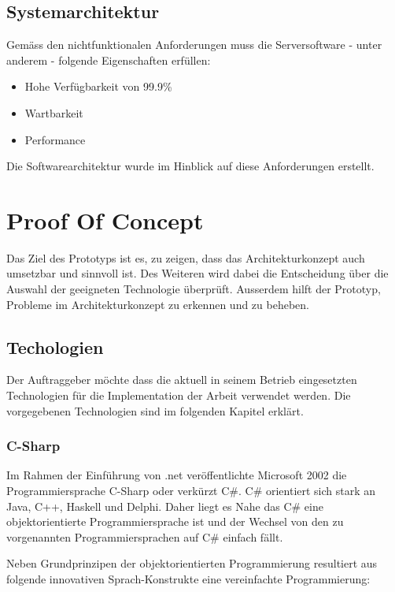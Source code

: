 \section{Systemarchitektur}\label{systemarchitektur}

Gemäss den nichtfunktionalen Anforderungen muss die Serversoftware -
unter anderem - folgende Eigenschaften erfüllen:

\begin{itemize}
\tightlist
\item
  Hohe Verfügbarkeit von 99.9\%
\item
  Wartbarkeit
\item
  Performance
\end{itemize}

Die Softwarearchitektur wurde im Hinblick auf diese Anforderungen
erstellt.

\chapter{Proof Of Concept}\label{proof-of-concept}

Das Ziel des Prototyps ist es, zu zeigen, dass das Architekturkonzept
auch umsetzbar und sinnvoll ist. Des Weiteren wird dabei die
Entscheidung über die Auswahl der geeigneten Technologie überprüft.
Ausserdem hilft der Prototyp, Probleme im Architekturkonzept zu erkennen
und zu beheben.

\section{Techologien}\label{techologien}

Der Auftraggeber möchte dass die aktuell in seinem Betrieb eingesetzten
Technologien für die Implementation der Arbeit verwendet werden. Die
vorgegebenen Technologien sind im folgenden Kapitel erklärt.

\subsection{C-Sharp}\label{c-sharp}

Im Rahmen der Einführung von .net veröffentlichte Microsoft 2002 die
Programmiersprache C-Sharp oder verkürzt C\#. C\# orientiert sich stark
an Java, C++, Haskell und Delphi. Daher liegt es Nahe das C\# eine
objektorientierte Programmiersprache ist und der Wechsel von den zu
vorgenannten Programmiersprachen auf C\# einfach fällt.

Neben Grundprinzipen der objektorientierten Programmierung resultiert
aus folgende innovativen Sprach-Konstrukte eine vereinfachte
Programmierung:

